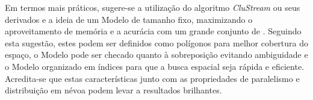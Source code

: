 Em termos mais práticos, sugere-se a utilização do algoritmo \emph{CluStream}
\cite{Aggarwal2003} ou seus derivados e a ideia de um Modelo de tamanho fixo,
maximizando o aproveitamento de memória e a acurácia com um grande conjunto de
\mclusters.
Seguindo esta sugestão, estes \mclusters podem ser definidos como polígonos para
melhor cobertura do espaço, o Modelo pode ser checado quanto à sobreposição
evitando ambiguidade e o Modelo organizado em índices para que a busca espacial
seja rápida e eficiente.
Acredita-se que estas características junto com as propriedades de paralelismo e
distribuição em névoa podem levar a resultados brilhantes.








